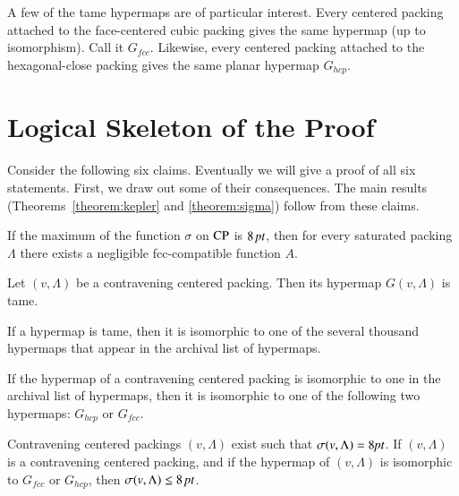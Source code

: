 A few of the tame hypermaps are of particular interest. Every
centered packing attached to the face-centered cubic packing gives
the same hypermap (up to isomorphism).  Call it $G_{fcc}$.
Likewise, every centered packing attached to the hexagonal-close
packing gives the same planar hypermap $G_{hcp}$.


\section{Logical Skeleton of the Proof}
\label{sec:logic}

Consider the following six claims.  Eventually we will give a
proof of all six statements.  First, we draw out some of their
consequences.  The main results (Theorems~\ref{theorem:kepler} and
\ref{theorem:sigma}) follow from these claims.

\begin{claim}\label{claim-A}
If the maximum of the function $\sigma$ on ${\operatorname{CP}}$ is $8\,\hbox{\it pt}$,
then for every saturated packing $\Lambda$ there exists a
negligible fcc-compatible function $A$.
\end{claim}

\begin{claim}\label{claim-B}
Let $(v,\Lambda)$ be a contravening centered packing. Then its hypermap
$G(v,\Lambda)$ is tame.
\end{claim} %

\begin{claim}\label{claim-C}
If a hypermap is tame, then it is isomorphic to one of the several
thousand hypermaps that appear in the archival list of hypermaps.
\end{claim} %

\begin{claim}\label{claim-D}
If the hypermap of a contravening centered packing is isomorphic
to one in the archival list of hypermaps, then it is isomorphic to
one of the following two hypermaps:  $G_{hcp}$ or $G_{fcc}$.
\end{claim} %


\begin{claim}\label{claim-F}
Contravening centered packings $(v,\Lambda)$ exist such that
$\sigma(v,\Lambda)=8\hbox{\it pt}$. If $(v,\Lambda)$ is a contravening centered packing, and
if the hypermap of $(v,\Lambda)$ is isomorphic to $G_{fcc}$ or $G_{hcp}$,
then $\sigma(v,\Lambda) \le 8\,\hbox{\it pt}$.
\end{claim} %


